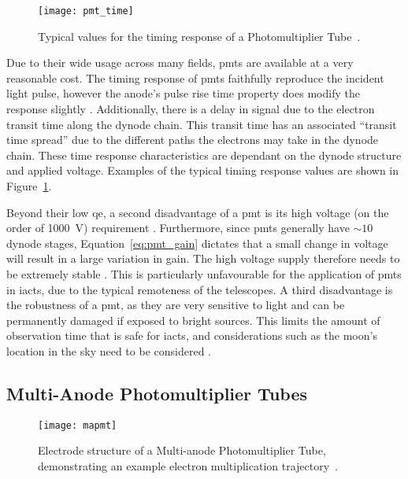 \begin{figure}
	\centering
    \texttt{[image: pmt\_time]} 
	\caption[Photomultiplier Tube timing characteristics.]{Typical values for the timing response of a Photomultiplier Tube~\cite{Hamamatsu2016}.}
	\label{fig:pmt_time}
\end{figure}

Due to their wide usage across many fields, \glspl{pmt} are available at a very reasonable cost. The timing response of \glspl{pmt} faithfully reproduce the incident light pulse, however the anode's pulse rise time property does modify the response slightly \cite{Hamamatsu2016}. Additionally, there is a delay in signal due to the electron transit time along the dynode chain. This transit time has an associated ``transit time spread'' due to the different paths the electrons may take in the dynode chain. These time response characteristics are dependant on the dynode structure and applied voltage. Examples of the typical timing response values are shown in Figure~\ref{fig:pmt_time}.

Beyond their low \gls{qe}, a second disadvantage of a \gls{pmt} is its high voltage (on the order of \SI{1000}{V}) requirement \cite{Weekes2003}. Furthermore, since \glspl{pmt} generally have ${\sim} 10$ dynode stages, Equation~\ref{eq:pmt_gain} dictates that a small change in voltage will result in a large variation in gain. The high voltage supply therefore needs to be extremely stable \cite{Hamamatsu2016}. This is particularly unfavourable for the application of \glspl{pmt} in \glspl{iact}, due to the typical remoteness of the telescopes. A third disadvantage is the robustness of a \gls{pmt}, as they are very sensitive to light and can be permanently damaged if exposed to bright sources. This limits the amount of observation time that is safe for \glspl{iact}, and considerations such as the moon's location in the sky need to be considered \cite{Knoetig2013}.

\subsection{Multi-Anode Photomultiplier Tubes}

\begin{figure}
	\centering
    \texttt{[image: mapmt]} 
	\caption[Internals of a Multi-anode Photomultiplier Tube.]{Electrode structure of a Multi-anode Photomultiplier Tube, demonstrating an example electron multiplication trajectory~\cite{HAMAMATSU2007}.}
	\label{fig:mapmt}
\end{figure}

